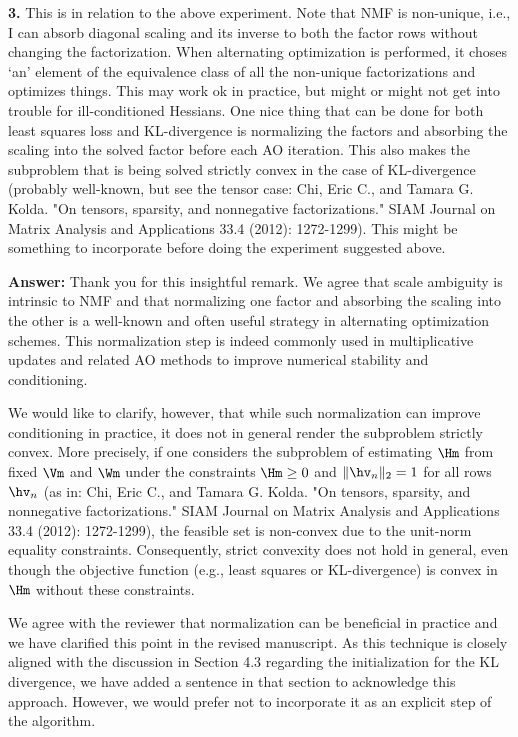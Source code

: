 \documentclass[10pt]{article} %
\newcommand{\answer}[1]{{\textbf{Answer:} \color{blue} #1}}
\begin{document}
\textbf{3.} This is in relation to the above experiment. Note that NMF is non-unique, i.e., I can absorb diagonal scaling and its inverse to both the factor rows without changing the factorization. When alternating optimization is performed, it choses `an' element of the equivalence class of all the non-unique factorizations and optimizes things. This may work ok in practice, but might or might not get into trouble for ill-conditioned Hessians. One nice thing that can be done for both least squares loss and KL-divergence is normalizing the factors and absorbing the scaling into the solved factor before each AO iteration. This also makes the subproblem that is being solved strictly convex in the case of KL-divergence (probably well-known, but see the tensor case: Chi, Eric C., and Tamara G. Kolda. "On tensors, sparsity, and nonnegative factorizations." SIAM Journal on Matrix Analysis and Applications 33.4 (2012): 1272-1299). This might be something to incorporate before doing the experiment suggested above.

\answer{Thank you for this insightful remark. We agree that scale ambiguity is intrinsic to NMF and that normalizing one factor and absorbing the scaling into the other is a well-known and often useful strategy in alternating optimization schemes. This normalization step is indeed commonly used in multiplicative updates and related AO methods to improve numerical stability and conditioning.

We would like to clarify, however, that while such normalization can improve conditioning in practice, it does not in general render the subproblem strictly convex. More precisely, if one considers the subproblem of estimating $\Hm$ from fixed $\Vm$ and $\Wm$ under the constraints $\Hm \ge 0$ and $\|\hv_n\|_2 = 1$ for all rows $\hv_n$ (as in: Chi, Eric C., and Tamara G. Kolda. "On tensors, sparsity, and nonnegative factorizations." SIAM Journal on Matrix Analysis and Applications 33.4 (2012): 1272-1299), the feasible set is non-convex due to the unit-norm equality constraints. Consequently, strict convexity does not hold in general, even though the objective function (e.g., least squares or KL-divergence) is convex in $\Hm$ without these constraints. 

We agree with the reviewer that normalization can be beneficial in practice and we have clarified this point in the revised manuscript. As this technique is closely aligned with the discussion in Section 4.3 regarding the initialization for the KL divergence, we have added a sentence in that section to acknowledge this approach. However, we would prefer not to incorporate it as an explicit step of the algorithm.
 
}
\end{document}
